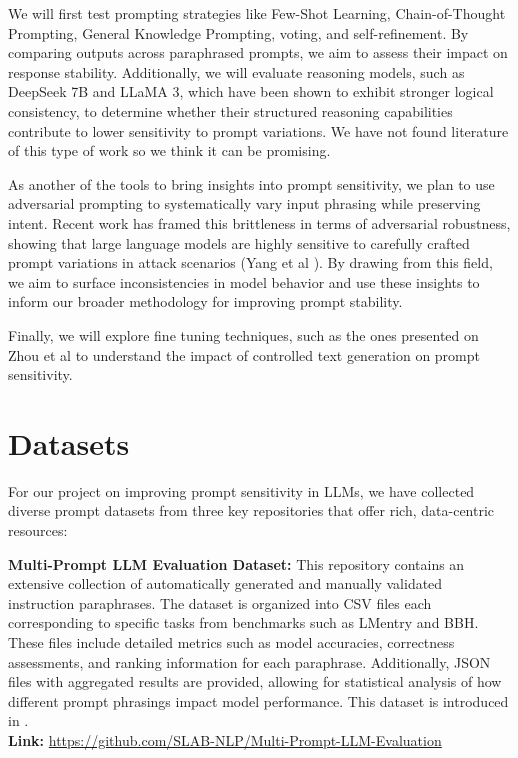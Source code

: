 \documentclass[fleqn,moreauthors,10pt]{ds_report}
\begin{document}
We will first test prompting strategies like Few-Shot Learning, Chain-of-Thought Prompting, General Knowledge Prompting, voting, and self-refinement. By comparing outputs across paraphrased prompts, we aim to assess their impact on response stability. Additionally, we will evaluate reasoning models, such as DeepSeek 7B and LLaMA 3, which have been shown to exhibit stronger logical consistency, to determine whether their structured reasoning capabilities contribute to lower sensitivity to prompt variations. We have not found literature of this type of work so we think it can be promising.

As another of the tools to bring insights into prompt sensitivity, we plan to use adversarial prompting to systematically vary input phrasing while preserving intent.  Recent work has framed this brittleness in terms of adversarial robustness, showing that large language models are highly sensitive to carefully crafted prompt variations in attack scenarios (Yang et al \cite{yang2024assessingadversarialrobustnesslarge}). By drawing from this field, we aim to surface inconsistencies in model behavior and use these insights to inform our broader methodology for improving prompt stability.


Finally, we will explore fine tuning techniques, such as the ones presented on Zhou et al \cite{zhou2023controlledtextgenerationnatural} to understand the impact of controlled text generation on prompt sensitivity.


\section*{Datasets}

For our project on improving prompt sensitivity in LLMs, we have collected diverse prompt datasets from three key repositories that offer rich, data-centric resources:

\textbf{Multi-Prompt LLM Evaluation Dataset:} This repository contains an extensive collection of automatically generated and manually validated instruction paraphrases. The dataset is organized into CSV files each corresponding to specific tasks from benchmarks such as LMentry and BBH. These files include detailed metrics such as model accuracies, correctness assessments, and ranking information for each paraphrase. Additionally, JSON files with aggregated results are provided, allowing for statistical analysis of how different prompt phrasings impact model performance. This dataset is introduced in \cite{mizrahi-etal-2024-state}.\\
\textbf{Link:} \url{https://github.com/SLAB-NLP/Multi-Prompt-LLM-Evaluation}
\end{document}
